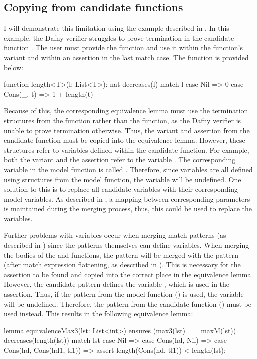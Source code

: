\subsection{Copying from candidate functions}\label{sec:candidate-copying}

I will demonstrate this limitation using the example described in . In this example, the Dafny verifier struggles to prove termination in the candidate function . The user must provide the  function and use it within the function's variant and within an assertion in the last match case. The  function is provided below:
\begin{dafny}
function length<T>(l: List<T>): nat
  decreases(l) {
  match l {
    case Nil        => 0
    case Cons(_, t) => 1 + length(t)
  }
}
\end{dafny}
%
Because of this, the corresponding equivalence lemma must use the termination structures from the  function rather than the  function, as the Dafny verifier is unable to prove termination otherwise. Thus, the variant and assertion from the candidate function  must be copied into the equivalence lemma. However, these structures refer to variables defined within the candidate function. For example, both the variant and the assertion refer to the variable . The corresponding variable in the model function is called . Therefore, since variables are all defined using structures from the model function, the  variable will be undefined. One solution to this is to replace all candidate variables with their corresponding model variables. As described in , a mapping between corresponding parameters is maintained during the merging process, thus, this could be used to replace the variables. 

Further problems with variables occur when merging match patterns (as described in ) since the patterns themselves can define variables. When merging the bodies of the  and  functions, the pattern  will be merged with the pattern  (after match expression flattening, as described in ). This is necessary for the assertion to be found and copied into the correct place in the equivalence lemma. However, the candidate pattern defines the variable , which is used in the assertion. Thus, if the pattern from the model function () is used, the variable  will be undefined. Therefore, the pattern from the candidate function () must be used instead. This results in the following equivalence lemma:
\begin{dafny}
lemma equivalenceMax3(lst: List<int>)
  ensures (max3(lst) == maxM(lst))
  decreases(length(lst))
{
  match lst {
    case Nil => {}
    case Cons(hd, Nil) => {}
    case Cons(hd, Cons(hd1, tl1)) => assert length(Cons(hd, tl1)) < length(lst);
  }
}
\end{dafny}

